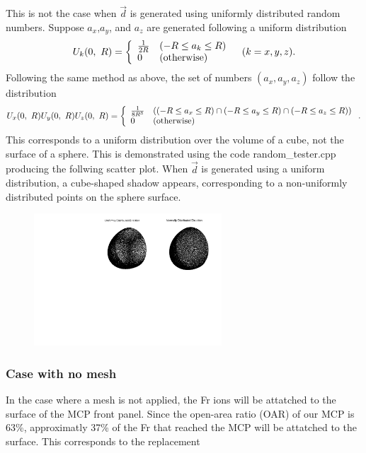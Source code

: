 \documentclass{article}
\begin{document}
This is not the case when $\vec{d}$ is generated using uniformly distributed random numbers. Suppose $a_x$,$a_y$, and $a_z$ are generated following a uniform distribution
$$
U_k(0,\ R) = \left\{
\begin{array}{ll}
	\frac{1}{2R} & (-R \le a_k \le R) \\
	0 & ({\rm otherwise})
\end{array} \right. \, \, \, \, \, (k = x, y, z).
$$
Following the same method as above, the set of numbers $(a_x, a_y, a_z)$ follow the distribution
$$
U_x(0,\ R) U_y(0,\ R) U_z(0,\ R) = \left\{
\begin{array}{ll}
	\frac{1}{8R^3} & \left( (-R \le a_x \le R) \cap (-R \le a_y \le R) \cap (-R \le a_z \le R) \right) \\
	0 & ({\rm otherwise})
\end{array} \right. .
$$
This corresponds to a uniform distribution over the volume of a cube, not the surface of a sphere. This is demonstrated using the code random\_tester.cpp producing the follwing scatter plot. When $\vec{d}$ is generated using a uniform distribution, a cube-shaped shadow appears, corresponding to a non-uniformly distributed points on the sphere surface.

\begin{figure}[H]
  \begin{center}
    \includegraphics[width=7.0cm,angle=-90]{./random_tester.pdf}
  \end{center}
\end{figure}




\subsubsection{Case with no mesh}
In the case where a mesh is not applied, the Fr ions will be attatched to the surface of the MCP front panel. Since the open-area ratio (OAR) of our MCP is 63\%, approximatly 37\% of the Fr that reached the MCP will be attatched to the surface. This corresponds to the replacement
\end{document}
